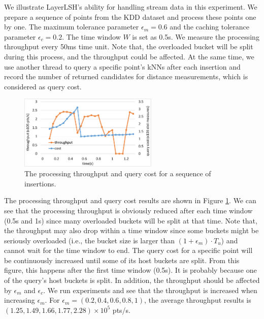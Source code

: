 We illustrate LayerLSH's ability for handling stream data in this experiment. We prepare a sequence of points from the KDD dataset and process these points one by one. The maximum tolerance parameter $\epsilon_m=0.6$ and the caching tolerance parameter $\epsilon_c=0.2$. The time window $W$ is set as 0.5s. We measure the processing throughput every 50ms time unit. Note that, the overloaded bucket will be split during this process, and the throughput could be affected. At the same time, we use another thread to query a specific point's kNNs after each insertion and record the number of returned candidates for distance measurements, which is considered as query cost.

\begin{figure}[t]
    \centerline{\includegraphics[width=2.6in]{fig/streaminsert.eps}}
    \vspace{-0.1in}
    \caption{The processing throughput and query cost for a sequence of insertions.}
    \label{fig:streaminsert}
\end{figure}

The processing throughput and query cost results are shown in Figure \ref{fig:streaminsert}. We can see that the processing throughput is obviously reduced after each time window (0.5s and 1s) since many overloaded buckets will be split at that time. Note that, the throughput may also drop within a time window since some buckets might be seriously overloaded (i.e., the bucket size is larger than $(1+\epsilon_m)\cdot T_u$) and cannot wait for the time window to end. The query cost for a specific point will be continuously increased until some of its host buckets are split. From this figure, this happens after the first time window (0.5s). It is probably because one of the query's host buckets is split. In addition, the throughput should be affected by $\epsilon_m$ and $\epsilon_c$. We run experiments and see that the throughput is increased when increasing $\epsilon_m$. For $\epsilon_m=(0.2,0.4,0.6,0.8,1)$, the average throughput results is $(1.25,1.49,1.66,1.77,2.28)\times 10^5$ pts/s.

